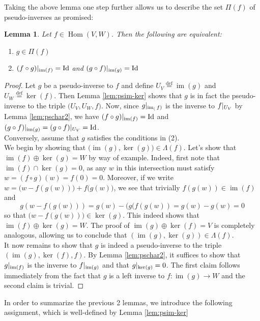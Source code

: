 \documentclass{book}
\theoremstyle{plain}
\newtheorem{lemma}[corollary]{Lemma}
\theoremstyle{definition}
\newcommand{\define}{\stackrel{\operatorname{def}}{=}}
\newcommand{\ds}{\oplus}
\DeclareMathOperator{\Hom}{Hom}
\DeclareMathOperator{\Id}{Id}
\DeclareMathOperator{\im}{im}
\newcommand{\mor}{\longrightarrow}
\begin{document}
Taking the above lemma one step further allows us to describe the set $\Pi(f)$ of pseudo-inverses as promised:

\begin{lemma}\label{lem:charpi}
	Let $f \in \Hom(V,W)$. Then the following are equivalent:
	\begin{enumerate}
	\item $g \in \Pi(f)$
	\item $(f\circ g)\arrowvert_{\im(f)}=\Id$ and $(g\circ f)\arrowvert_{\im(g)}=\Id$ 
	\end{enumerate}
\end{lemma}

\begin{proof}
	Let $g$ be a pseudo-inverse to $f$ and define $U_V\define\im(g)$ and $U_W\define\ker(f)$. Then Lemma \ref{lem:psim-ker} shows that $g$ is in fact the pseudo-inverse to the triple $\big(U_V,U_W,f\big)$. Now, since $g\arrowvert_{\im_(f)}$ is the inverse to $f\arrowvert_{U_V}$ by Lemma \ref{lem:pschar2}, we have $(f \circ g)\arrowvert_{\im(f)}=\Id$ and $(g \circ f)\arrowvert_{\im(g)}=(g \circ f)\arrowvert_{U_V}=\Id$.\\
	Conversely, assume that $g$ satisfies the conditions in (2).\\
	We begin by showing that $\big(\im(g),\ker(g)\big) \in \Lambda(f)$. Let's show  that $\im(f)\ds \ker(g)=W$ by way of example. Indeed, first note that $\im(f)\cap \ker(g)=0$, as any $w$ in this intersection must satisfy $w=(f\circ g)(w)=f(0)=0$. Moreover, if we write $w=\big(w-f( g(w))\big)+f ( g(w)\big)$, we see that trivially $f(g(w))\in \im (f)$ and \[
	g(w-f(g(w)))=g(w)-(g(f(g(w))=g(w)-g(w)=0
	\]
	so that $\big(w-f(g(w))\big) \in \ker(g)$. This indeed shows that $\im(f)\ds \ker(g)=W$. The proof of $\im(g)\ds \ker(f)=V$ is completely analogous, allowing us to conclude that $(\im(g),\ker(g))\in \Lambda(f)$.\\
	It now remains to show that $g$ is indeed a pseudo-inverse to the triple $(\im(g),\ker(f),f)$. By Lemma \ref{lem:pschar2}, it suffices to show that $g\arrowvert_{\im(f)}$ is the inverse to $f\arrowvert_{\im(g)}$ and that $g\arrowvert_{\ker(g)}=0$. The first claim follows immediately from the fact that $g$ is a left inverse to $f:\im(g)\mor W$ and the second claim is trivial.
\end{proof}

\noindent In order to summarize the previous 2 lemmas, we introduce the following assignment, which is well-defined by Lemma \ref{lem:psim-ker}
\end{document}
